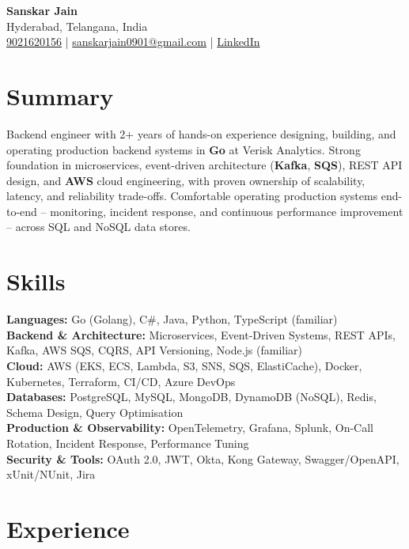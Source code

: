 \documentclass[a4paper,10pt]{article}
\begin{document}
\begin{center}
    {\LARGE \textbf{Sanskar Jain}} \\
    Hyderabad, Telangana, India \\
    \href{tel:9021620156}{9021620156} \;|\;
    \href{mailto:sanskarjain0901@gmail.com}{sanskarjain0901@gmail.com} \;|\;
    \href{https://www.linkedin.com/in/sanskar-jain0901/}{LinkedIn}
\end{center}

\vspace{3pt}

\section*{Summary}
Backend engineer with 2+ years of hands-on experience designing, building, and operating production backend systems in \textbf{Go} at Verisk Analytics.
Strong foundation in microservices, event-driven architecture (\textbf{Kafka}, \textbf{SQS}), REST API design, and \textbf{AWS} cloud engineering, with proven ownership of scalability, latency, and reliability trade-offs.
Comfortable operating production systems end-to-end -- monitoring, incident response, and continuous performance improvement -- across SQL and NoSQL data stores.

\section*{Skills}
\textbf{Languages:} Go (Golang), C\#, Java, Python, TypeScript (familiar) \\
\textbf{Backend \& Architecture:} Microservices, Event-Driven Systems, REST APIs, Kafka, AWS SQS, CQRS, API Versioning, Node.js (familiar) \\
\textbf{Cloud:} AWS (EKS, ECS, Lambda, S3, SNS, SQS, ElastiCache), Docker, Kubernetes, Terraform, CI/CD, Azure DevOps \\
\textbf{Databases:} PostgreSQL, MySQL, MongoDB, DynamoDB (NoSQL), Redis, Schema Design, Query Optimisation \\
\textbf{Production \& Observability:} OpenTelemetry, Grafana, Splunk, On-Call Rotation, Incident Response, Performance Tuning \\
\textbf{Security \& Tools:} OAuth 2.0, JWT, Okta, Kong Gateway, Swagger/OpenAPI, xUnit/NUnit, Jira

\section*{Experience}
\end{document}
